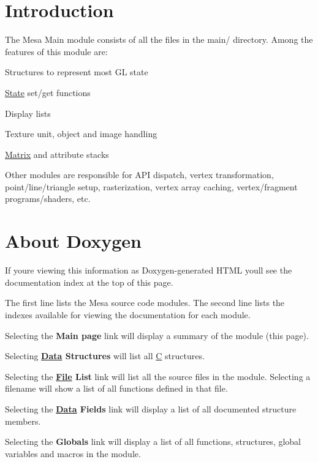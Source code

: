 \hypertarget{index_MainIntroduction}{}\section{Introduction}\label{index_MainIntroduction}
The Mesa Main module consists of all the files in the main/ directory. Among the features of this module are\+: 
\begin{DoxyItemize}
\item Structures to represent most GL state  
\item \hyperlink{struct_state}{State} set/get functions  
\item Display lists  
\item Texture unit, object and image handling  
\item \hyperlink{class_matrix}{Matrix} and attribute stacks  
\end{DoxyItemize}

Other modules are responsible for A\+PI dispatch, vertex transformation, point/line/triangle setup, rasterization, vertex array caching, vertex/fragment programs/shaders, etc.\hypertarget{index_AboutDoxygen}{}\section{About Doxygen}\label{index_AboutDoxygen}
If you\textquotesingle{}re viewing this information as Doxygen-\/generated H\+T\+ML you\textquotesingle{}ll see the documentation index at the top of this page.

The first line lists the Mesa source code modules. The second line lists the indexes available for viewing the documentation for each module.

Selecting the {\bfseries Main page} link will display a summary of the module (this page).

Selecting {\bfseries \hyperlink{struct_data}{Data} Structures} will list all \hyperlink{struct_c}{C} structures.

Selecting the {\bfseries \hyperlink{class_file}{File} List} link will list all the source files in the module. Selecting a filename will show a list of all functions defined in that file.

Selecting the {\bfseries \hyperlink{struct_data}{Data} Fields} link will display a list of all documented structure members.

Selecting the {\bfseries Globals} link will display a list of all functions, structures, global variables and macros in the module. 